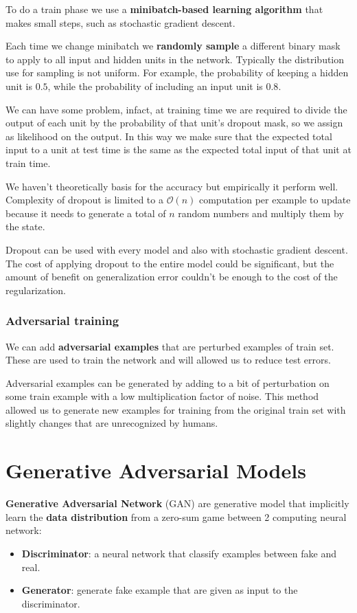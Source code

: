To do a train phase we use a \textbf{minibatch-based learning algorithm} that
makes small steps, such as stochastic gradient descent.

Each time we change minibatch we \textbf{randomly sample} a different binary mask
to apply to all input and hidden units in the network. Typically the distribution
use for sampling is not uniform. For example, the probability of keeping a hidden
unit is $0.5$, while the probability of including an input unit is $0.8$.

We can have some problem, infact, at training time we are required to divide the
output of each unit by the probability of that unit's dropout mask, so we assign
as likelihood on the output. In this way we make sure that the expected total
input to a unit at test time is the same as the expected total input of that unit
at train time.

We haven't theoretically basis for the accuracy but empirically it perform well.
Complexity of dropout is limited to a $\mathcal{O}(n)$ computation per example
to update because it needs to generate a total of $n$ random numbers and multiply
them by the state.

Dropout can be used with every model and also with stochastic gradient descent.
The cost of applying dropout to the entire model could be significant, but the
amount of benefit on generalization error couldn't be enough to the cost of the
regularization.
\subsubsection{Adversarial training}
We can add \textbf{adversarial examples} that are perturbed examples of train
set. These are used to train the network and will allowed us to reduce test errors.

Adversarial examples can be generated by adding to a bit of perturbation on some
train example with a low multiplication factor of noise. This method allowed us
to generate new examples for training from the original train set with slightly
changes that are unrecognized by humans.
\section{Generative Adversarial Models}
\textbf{Generative Adversarial Network} (GAN) are generative model that
implicitly learn the \textbf{data distribution} from a zero-sum game between 2
computing neural network:
\begin{itemize}
    \item \textbf{Discriminator}: a neural network that classify examples between
          fake and real.
    \item \textbf{Generator}: generate fake example that are given as input to the
          discriminator.
\end{itemize}

